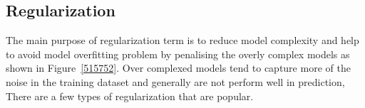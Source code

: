 \subsection{Regularization}

The main purpose of regularization term is to reduce model complexity and help to avoid model overfitting problem by penalising the overly complex models as shown in Figure~\ref{515752}. Over complexed models tend to capture more of the noise in the training dataset and generally are not perform well in prediction,  There are a few types of regularization that are popular. 